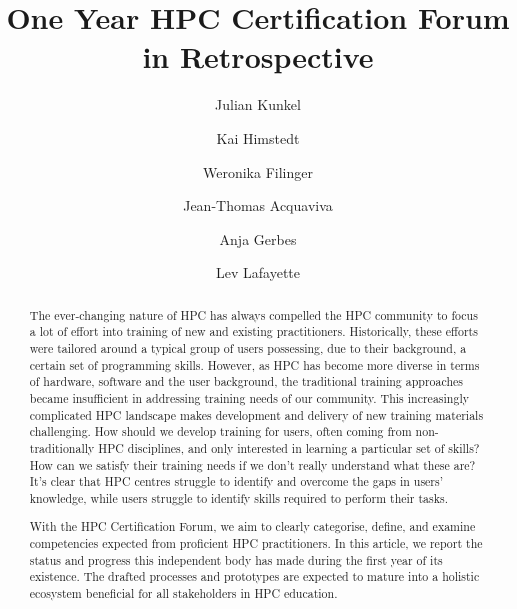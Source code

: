 \documentclass[jocse]{jocseart}
\begin{document}
\title{One Year HPC Certification Forum in Retrospective}

\author{Julian Kunkel}


\author{Kai Himstedt}

\author{Weronika Filinger}

\author{Jean-Thomas Acquaviva}


\author{Anja Gerbes}

\author{Lev Lafayette}

\renewcommand{\shortauthors}{J. Kunkel et al.}


\begin{abstract}

The ever-changing nature of HPC has always compelled the HPC community to focus a lot of effort into training of new and existing practitioners. Historically, these efforts were tailored
 around a typical group of users possessing, due to their background, a certain set of programming skills. However, as HPC has become more diverse in terms of hardware, software and
 the user background, the traditional training approaches became insufficient in addressing training needs of our community. This increasingly complicated HPC landscape makes
 development and delivery of new training materials challenging. How should we develop training for users, often coming from non-traditionally HPC disciplines, and only interested in
 learning a particular set of skills? How can we satisfy their training needs if we don't really understand what these are? It's clear that HPC centres struggle to identify and overcome the
 gaps in users' knowledge, while users struggle to identify skills required to perform their tasks.

With the HPC Certification Forum, we aim to clearly categorise, define, and examine competencies expected from proficient HPC practitioners.
In this article, we report the status and progress this independent body has made during the first year of its existence. The drafted processes and prototypes are expected to mature into a
holistic ecosystem beneficial for all stakeholders in HPC education.
\end{abstract}
\end{document}
